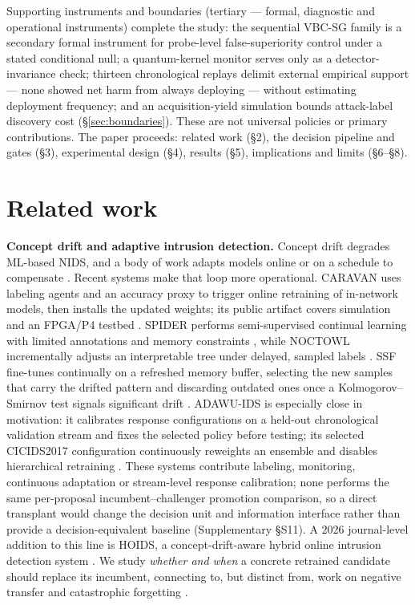 \documentclass[journal]{IEEEtran}
\begin{document}
Supporting instruments and boundaries (tertiary --- formal, diagnostic and operational instruments) complete the study: the sequential VBC-SG family is a secondary formal instrument for probe-level false-superiority control under a stated conditional null; a quantum-kernel monitor serves only as a detector-invariance check; thirteen chronological replays delimit external empirical support --- none showed net harm from always deploying --- without estimating deployment frequency; and an acquisition-yield simulation bounds attack-label discovery cost (\S\ref{sec:boundaries}). These are not universal policies or primary contributions. The paper proceeds: related work (\S2), the decision pipeline and gates (\S3), experimental design (\S4), results (\S5), implications and limits (\S6--\S8).


\section{Related work}


\textbf{Concept drift and adaptive intrusion detection.} Concept drift degrades ML-based NIDS, and a body of work adapts models online or on a schedule to compensate \cite{gama2014survey,lu2019learning,shyaa2024evolving}. Recent systems make that loop more operational. CARAVAN uses labeling agents and an accuracy proxy to trigger online retraining of in-network models, then installs the updated weights; its public artifact covers simulation and an FPGA/P4 testbed \cite{zhang2024caravan}. SPIDER performs semi-supervised continual learning with limited annotations and memory constraints \cite{amalapuram2024spider}, while NOCTOWL incrementally adjusts an interpretable tree under delayed, sampled labels \cite{pederzoli2025noctowl}. SSF fine-tunes continually on a refreshed memory buffer, selecting the new samples that carry the drifted pattern and discarding outdated ones once a Kolmogorov--Smirnov test signals significant drift \cite{zhang2025ssf}. ADAWU-IDS is especially close in motivation: it calibrates response configurations on a held-out chronological validation stream and fixes the selected policy before testing; its selected CICIDS2017 configuration continuously reweights an ensemble and disables hierarchical retraining \cite{yuan2026adawu}. These systems contribute labeling, monitoring, continuous adaptation or stream-level response calibration; none performs the same per-proposal incumbent--challenger promotion comparison, so a direct transplant would change the decision unit and information interface rather than provide a decision-equivalent baseline (Supplementary \S S11). A 2026 journal-level addition to this line is HOIDS, a concept-drift-aware hybrid online intrusion detection system \cite{depaola2026hoids}. We study \emph{whether and when} a concrete retrained candidate should replace its incumbent, connecting to, but distinct from, work on negative transfer and catastrophic forgetting \cite{mccloskey1989catastrophic,kirkpatrick2017overcoming,zhang2023survey}.
\end{document}
